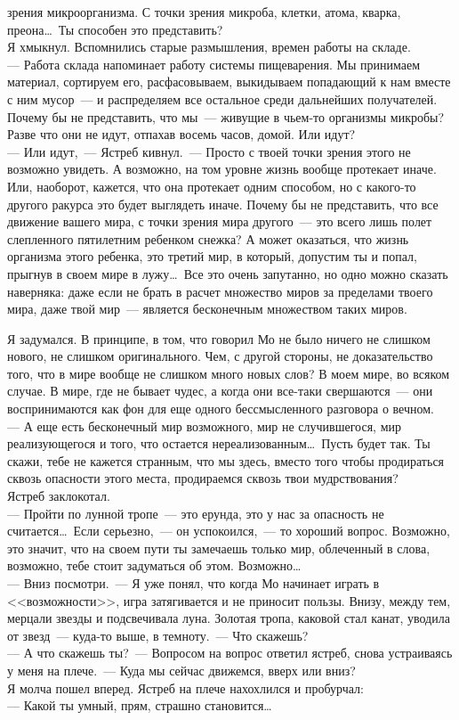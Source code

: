 зрения микроорганизма. С точки зрения микроба, клетки, атома, кварка, 
преона\ldots\ Ты способен это представить?\\
Я хмыкнул. Вспомнились старые размышления, времен работы на складе.\\
--- Работа склада напоминает работу системы пищеварения. Мы принимаем материал, 
сортируем его, расфасовываем, выкидываем попадающий к нам вместе с ним 
мусор~--- и распределяем все остальное среди дальнейших получателей. Почему бы не 
представить, что мы~--- живущие в чьем-то организмы микробы? Разве что они не 
идут, отпахав восемь часов, домой. Или идут?\\
--- Или идут,~--- Ястреб кивнул.~--- Просто с твоей точки зрения этого не 
возможно увидеть. А возможно, на том уровне жизнь вообще протекает иначе. Или, наоборот, 
кажется, что она протекает одним способом, но с какого-то другого ракурса это 
будет выглядеть иначе. Почему бы не представить, что все движение вашего мира, 
с точки зрения мира другого~--- это всего лишь полет слепленного пятилетним 
ребенком снежка? А может оказаться, что жизнь организма этого ребенка, это третий мир, в 
который, допустим ты и попал, прыгнув в своем мире в лужу\ldots\ Все это очень 
запутанно, но одно можно сказать наверняка: даже если не брать в расчет 
множество миров за пределами твоего мира, даже твой мир~--- является 
бесконечным множеством таких миров.


Я задумался. В принципе, в том, что говорил Мо не было ничего не слишком 
нового, не слишком оригинального. Чем, с другой стороны, не доказательство того, что в 
мире вообще не слишком много новых слов? В моем мире, во всяком случае. В мире, 
где не бывает чудес, а когда они все-таки свершаются~--- они воспринимаются как 
фон для еще одного бессмысленного разговора о вечном.\\
--- А еще есть бесконечный мир возможного, мир не случившегося, мир реализующегося 
и того, что остается нереализованным\ldots\ Пусть будет так. Ты скажи, тебе не 
кажется странным, что мы здесь, вместо того чтобы продираться сквозь опасности 
этого места, продираемся сквозь твои мудрствования?\\
Ястреб заклокотал.\\
--- Пройти по лунной тропе~--- это ерунда, это у нас за опасность не 
считается\ldots\ 
Если серьезно,~--- он успокоился,~--- то хороший вопрос. Возможно, это значит, 
что 
на своем пути ты замечаешь только мир, облеченный в слова, возможно, тебе стоит 
задуматься об этом. Возможно\ldots\\
--- Вниз посмотри.~--- Я уже понял, что когда Мо начинает играть в 
<<возможности>>, 
игра затягивается и не приносит пользы. Внизу, между тем, мерцали звезды и 
подсвечивала луна. Золотая тропа, каковой стал канат, уводила от звезд~--- 
куда-то 
выше, в темноту.~--- Что скажешь?\\
--- А что скажешь ты?~--- Вопросом на вопрос ответил ястреб, снова устраиваясь у 
меня на плече.~--- Куда мы сейчас движемся, вверх или вниз?\\
Я молча пошел вперед. Ястреб на плече нахохлился и пробурчал:\\
--- Какой ты умный, прям, страшно становится\ldots


